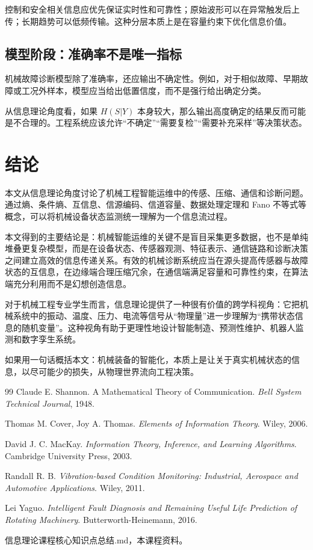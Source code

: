 \documentclass[UTF8,a4paper,12pt]{ctexart}
\begin{document}
控制和安全相关信息应优先保证实时性和可靠性；原始波形可以在异常触发后上传；长期趋势可以低频传输。这种分层本质上是在容量约束下优化信息价值。

\subsection{模型阶段：准确率不是唯一指标}

机械故障诊断模型除了准确率，还应输出不确定性。例如，对于相似故障、早期故障或工况外样本，模型应当给出低置信度，而不是强行给出确定分类。

从信息理论角度看，如果 $H(S|Y)$ 本身较大，那么输出高度确定的结果反而可能是不合理的。工程系统应该允许“不确定”“需要复检”“需要补充采样”等决策状态。

\section{结论}

本文从信息理论角度讨论了机械工程智能运维中的传感、压缩、通信和诊断问题。通过熵、条件熵、互信息、信源编码、信道容量、数据处理定理和 Fano 不等式等概念，可以将机械设备状态监测统一理解为一个信息流过程。

本文得到的主要结论是：机械智能运维的关键不是盲目采集更多数据，也不是单纯堆叠更复杂模型，而是在设备状态、传感器观测、特征表示、通信链路和诊断决策之间建立高效的信息传递关系。有效的机械诊断系统应当在源头提高传感器与故障状态的互信息，在边缘端合理压缩冗余，在通信端满足容量和可靠性约束，在算法端充分利用而不是幻想创造信息。

对于机械工程专业学生而言，信息理论提供了一种很有价值的跨学科视角：它把机械系统中的振动、温度、压力、电流等信号从“物理量”进一步理解为“携带状态信息的随机变量”。这种视角有助于更理性地设计智能制造、预测性维护、机器人监测和数字孪生系统。

如果用一句话概括本文：机械装备的智能化，本质上是让关于真实机械状态的信息，以尽可能少的损失，从物理世界流向工程决策。

\begin{thebibliography}{99}
Claude E. Shannon. A Mathematical Theory of Communication. \textit{Bell System Technical Journal}, 1948.

Thomas M. Cover, Joy A. Thomas. \textit{Elements of Information Theory}. Wiley, 2006.

David J. C. MacKay. \textit{Information Theory, Inference, and Learning Algorithms}. Cambridge University Press, 2003.

Randall R. B. \textit{Vibration-based Condition Monitoring: Industrial, Aerospace and Automotive Applications}. Wiley, 2011.

Lei Yaguo. \textit{Intelligent Fault Diagnosis and Remaining Useful Life Prediction of Rotating Machinery}. Butterworth-Heinemann, 2016.

信息理论课程核心知识点总结.md，本课程资料。
\end{thebibliography}
\end{document}
